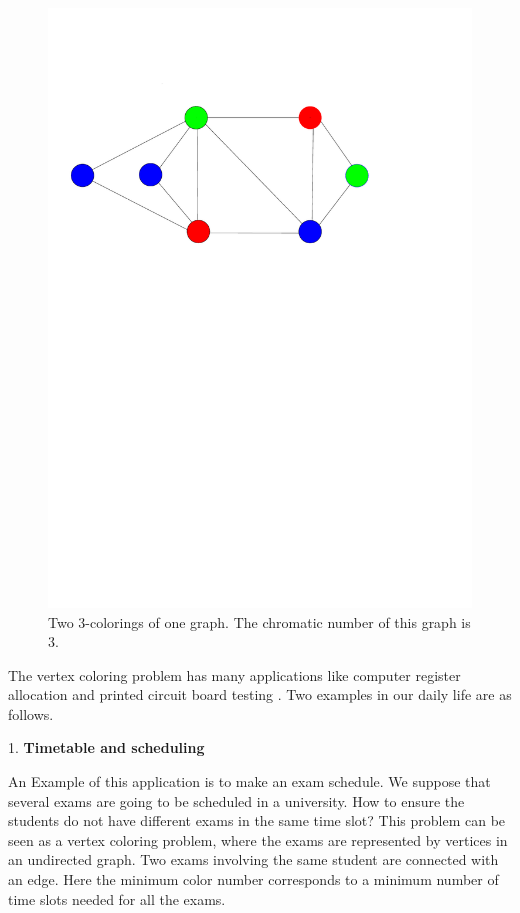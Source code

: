 \documentclass[12pt,a4paper,twoside]{scrartcl}
\numberwithin{equation}{section}
\begin{document}
\begin{figure}[h!]
\begin{minipage}[b]{0.49\textwidth}
    \includegraphics[width=\textwidth]{1/nodeColoring2.pdf}
  \end{minipage}
    \caption{Two 3-colorings of one graph. The chromatic number of this graph is 3.}

\end{figure}
The vertex coloring problem has many applications like computer register allocation \cite{chaitin1981register, chow1990priority} and printed circuit board testing \cite{garey1976application}. Two examples in our daily life are as follows.


1. \textbf{Timetable and scheduling} \cite{leighton1979graph,de1985introduction}

An Example of this application is to make an exam schedule. We suppose that several exams are going to be scheduled in a university. How to ensure the students do not have different exams in the same time slot? This problem can be seen as a vertex coloring problem, where the exams are represented by vertices in an undirected graph. Two exams involving the same student are connected with an edge. Here the minimum color number corresponds to a minimum number of time slots needed for all the exams.
\end{document}
